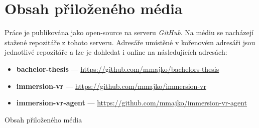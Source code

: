 \chapter{Obsah přiloženého média}

Práce je publikována jako open-source na serveru \emph{GitHub}. Na médiu se nacházejí stažené repozitáře z tohoto serveru. 
Adresáře umístěné v kořenovém adresáři jsou jednotlivé repozitáře a lze je dohledat i online na následujících adresách:

\begin{itemize}
  \item
    \textbf{bachelor-thesis} --- \url{https://github.com/mmajko/bachelors-thesis}
  \item
    \textbf{immersion-vr} --- \url{https://github.com/mmajko/immersion-vr}
  \item
    \textbf{immersion-vr-agent} --- \url{https://github.com/mmajko/immersion-vr-agent}
\end{itemize}

\vfill

\begin{dirfigure}%
\caption{Obsah přiloženého média}
\end{dirfigure}
